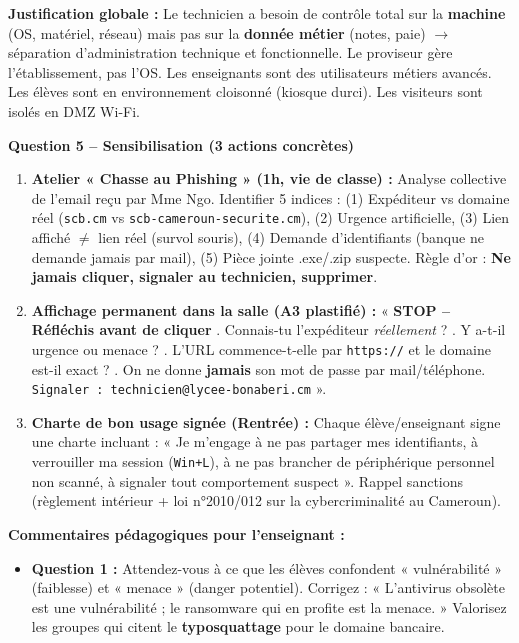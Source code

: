 \documentclass[11pt]{article}
\begin{document}
\begin{exoresolu}
\textbf{Justification globale :} Le technicien a besoin de contrôle total sur la \textbf{machine} (OS, matériel, réseau) mais pas sur la \textbf{donnée métier} (notes, paie) $\rightarrow$ séparation d'administration technique et fonctionnelle. Le proviseur gère l'établissement, pas l'OS. Les enseignants sont des utilisateurs métiers avancés. Les élèves sont en environnement cloisonné (kiosque durci). Les visiteurs sont isolés en DMZ Wi-Fi.

\textbf{Question 5 -- Sensibilisation (3 actions concrètes)}
\begin{enumerate}
    \item \textbf{Atelier « Chasse au Phishing » (1h, vie de classe) :} Analyse collective de l'email reçu par Mme Ngo. Identifier 5 indices : (1) Expéditeur vs domaine réel (\texttt{scb.cm} vs \texttt{scb-cameroun-securite.cm}), (2) Urgence artificielle, (3) Lien affiché $\neq$ lien réel (survol souris), (4) Demande d'identifiants (banque ne demande jamais par mail), (5) Pièce jointe .exe/.zip suspecte. Règle d'or : \textbf{Ne jamais cliquer, signaler au technicien, supprimer}.
    \item \textbf{Affichage permanent dans la salle (A3 plastifié) :} « \textbf{STOP -- Réfléchis avant de cliquer} . Connais-tu l'expéditeur \emph{réellement} ? . Y a-t-il urgence ou menace ? . L'URL commence-t-elle par \texttt{https://} et le domaine est-il exact ? . On ne donne \textbf{jamais} son mot de passe par mail/téléphone. \newline \texttt{Signaler : technicien@lycee-bonaberi.cm} ».
    \item \textbf{Charte de bon usage signée (Rentrée) :} Chaque élève/enseignant signe une charte incluant : « Je m'engage à ne pas partager mes identifiants, à verrouiller ma session (\texttt{Win+L}), à ne pas brancher de périphérique personnel non scanné, à signaler tout comportement suspect ». Rappel sanctions (règlement intérieur + loi n°2010/012 sur la cybercriminalité au Cameroun).
\end{enumerate}
\tcblower
\textbf{Commentaires pédagogiques pour l'enseignant :}
\begin{itemize}
    \item \textbf{Question 1 :} Attendez-vous à ce que les élèves confondent « vulnérabilité » (faiblesse) et « menace » (danger potentiel). Corrigez : « L'antivirus obsolète est une vulnérabilité ; le ransomware qui en profite est la menace. » Valorisez les groupes qui citent le \textbf{typosquattage} pour le domaine bancaire.

\end{itemize}
\end{exoresolu}
\end{document}
